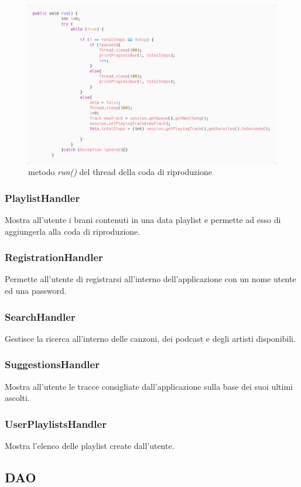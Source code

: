 \documentclass{article}
\begin{document}
  \begin{figure}[H]
    \centering
    \includegraphics[width=0.8\linewidth]{threadRun.png}
    \caption{metodo \textit{run()} del thread della coda di riproduzione}
    \label{fig:thread}
  \end{figure}



  \subsubsection{PlaylistHandler}
  Mostra all'utente i brani contenuti in una data playlist e permette ad esso di
  aggiungerla alla coda di riproduzione.
  \subsubsection{RegistrationHandler}
  Permette all'utente di registrarsi all'interno dell'applicazione con un
  nome utente ed una password.
  \subsubsection{SearchHandler}
  Gestisce la ricerca all'interno delle canzoni, dei podcast e degli artisti disponibili.
  \subsubsection{SuggestionsHandler}
  Mostra all'utente le tracce consigliate dall'applicazione sulla base dei suoi ultimi ascolti.
  \subsubsection{UserPlaylistsHandler}
  Mostra l'elenco delle playlist create dall'utente.

  \subsection{DAO}
\end{document}
